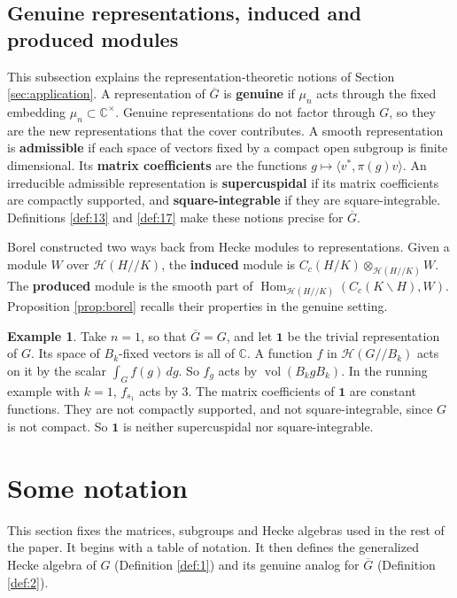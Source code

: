 \documentclass[12pt,letterpaper,reqno]{amsart}
\let\cal\mathcal
\theoremstyle{definition}
\newtheorem{example}[theorem]{Example}
\theoremstyle{remark}
\numberwithin{equation}{section}
\begin{document}
\subsection{Genuine representations, induced and produced modules}
\label{sec:bg-reps}

This subsection explains the representation-theoretic notions of Section
\ref{sec:application}. A representation of $\overline{G}$ is
\textbf{genuine} if $\mu_n$ acts through the fixed embedding
$\mu_n\subset\mathbb{C}^\times$. Genuine representations do not factor through
$G$, so they are the new representations that the cover contributes. A smooth
representation is \textbf{admissible} if each space of vectors fixed by a
compact open subgroup is finite dimensional. Its \textbf{matrix coefficients}
are the functions $g\mapsto\langle v^*,\pi(g)v\rangle$.
An irreducible admissible representation is \textbf{supercuspidal} if its
matrix coefficients are compactly supported, and \textbf{square-integrable} if
they are square-integrable. Definitions \ref{def:13} and \ref{def:17} make
these notions precise for $\overline{G}$.

Borel \cite{Bo76} constructed two ways back from Hecke modules to
representations. Given a module $W$ over ${\cal H}(H//K)$, the
\textbf{induced} module is $C_c(H/K)\otimes_{{\cal H}(H//K)}W$. The
\textbf{produced} module is the smooth part of
$\operatorname{Hom}_{{\cal H}(H//K)}(C_c(K\backslash H),W)$. Proposition
\ref{prop:borel} recalls their properties in the genuine setting.

\begin{example}
\label{ex:bg-reps}
Take $n=1$, so that $\overline{G}=G$, and let $\mathbf{1}$ be the trivial
representation of $G$. Its space of $B_k$-fixed vectors is all of
$\mathbb{C}$. A function $f$ in ${\cal H}(G//B_k)$ acts on it by the scalar
$\int_G f(g)\,dg$. So $f_g$ acts by $\operatorname{vol}(B_kgB_k)$. In the
running example with $k=1$, $f_{s_1}$ acts by $3$. The matrix coefficients of
$\mathbf{1}$ are constant functions. They are not compactly supported, and not
square-integrable, since $G$ is not compact. So $\mathbf{1}$ is neither
supercuspidal nor square-integrable.
\end{example}

\section{Some notation}
\label{sec:notation}

This section fixes the matrices, subgroups and Hecke algebras used in the rest
of the paper. It begins with a table of notation. It then defines the
generalized Hecke algebra of $G$ (Definition \ref{def:1}) and its genuine
analog for $\overline{G}$ (Definition \ref{def:2}).
\end{document}

